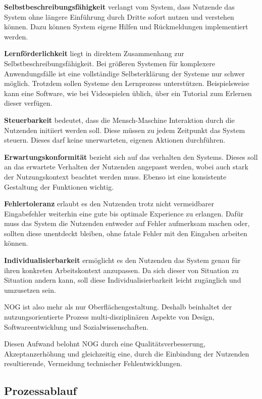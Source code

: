 \textbf{Selbstbeschreibungsfähigkeit} verlangt vom System, dass Nutzende das System ohne längere Einführung durch Dritte sofort nutzen und verstehen können.
Dazu können System eigene Hilfen und Rückmeldungen implementiert werden.

\textbf{Lernförderlichkeit} liegt in direktem Zusammenhang zur Selbstbeschreibungsfähigkeit.
Bei größeren Systemen für komplexere Anwendungsfälle ist eine vollständige Selbsterklärung der Systeme nur schwer möglich.
Trotzdem sollen Systeme den Lernprozess unterstützen.
Beispielsweise kann eine Software, wie bei Videospielen üblich, über ein Tutorial zum Erlernen dieser verfügen.

\textbf{Steuerbarkeit} bedeutet, dass die Mensch-Maschine Interaktion durch die Nutzenden initiiert werden soll.
Diese müssen zu jedem Zeitpunkt das System steuern.
Dieses darf keine unerwarteten, eigenen Aktionen durchführen.

\textbf{Erwartungskonformität} bezieht sich auf das verhalten den Systems.
Dieses soll an das erwartete Verhalten der Nutzenden angepasst werden, wobei auch stark der Nutzungskontext beachtet werden muss.
Ebenso ist eine konsistente Gestaltung der Funktionen wichtig.

\textbf{Fehlertoleranz} erlaubt es den Nutzenden trotz nicht vermeidbarer Eingabefehler weiterhin eine gute bis optimale Experience zu erlangen.
Dafür muss das System die Nutzenden entweder auf Fehler aufmerksam machen oder, sollten diese unentdeckt bleiben, ohne fatale Fehler mit den Eingaben arbeiten können.

\textbf{Individualisierbarkeit} ermöglicht es den Nutzenden das System genau für ihren konkreten Arbeitskontext anzupassen. 
Da sich dieser von Situation zu Situation andern kann, soll diese Individualisierbarkeit leicht zugänglich und umzusetzen sein.

NOG ist also mehr als nur Oberflächengestaltung.
Deshalb beinhaltet der nutzungsorientierte Prozess multi-disziplinären Aspekte von Design, Softwareentwicklung und Sozialwissenschaften.

Diesen Aufwand belohnt NOG durch eine Qualitätsverbesserung, Akzeptanzerhöhung und gleichzeitig eine, durch die Einbindung der Nutzenden resultierende, Vermeidung technischer Fehlentwicklungen.

\subsection{Prozessablauf}\label{sec:prozessablauf}


